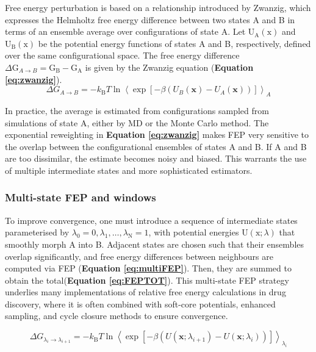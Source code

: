 \documentclass[12pt]{article}
\begin{document}
Free energy perturbation is based on a relationship introduced by Zwanzig\cite{CH10_zwanzig1954high}, which expresses the Helmholtz free energy difference between two states A and B in terms of an ensemble average over configurations of state A. 
Let $\textrm{U}_\textrm{A}(\textrm{x})$ and $\textrm{U}_\textrm{B}(\textrm{x})$ be the potential energy functions of states A and B, respectively, defined over the same configurational space. 
The free energy difference $\Delta \textrm{G}_{A\to B} = \textrm{G}_\textrm{B} - \textrm{G}_\textrm{A}$ is given by the Zwanzig equation (\textbf{Equation \ref{eq:zwanzig}}).
\
\begin{equation}
\Delta G_{A\to B} 
= -k_\mathrm{B}T \ln 
\left\langle 
\exp\left[ -\beta \left( U_B(\mathbf{x}) - U_A(\mathbf{x}) \right) \right]
\right\rangle_A
\label{eq:zwanzig}
\end{equation}

In practice, the average is estimated from configurations sampled from simulations of state A, either by MD or the Monte Carlo method. 
The exponential reweighting in \textbf{Equation \ref{eq:zwanzig}} makes FEP very sensitive to the overlap between the configurational ensembles of states A and B. If A and B are too dissimilar, the estimate becomes noisy and biased. This warrants the use of multiple intermediate states and more sophisticated estimators. 

\subsubsection{Multi-state FEP and windows}

To improve convergence, one must introduce a sequence of intermediate states parameterised by $\lambda_\textrm{0}=\textrm{0},\lambda_\textrm{1},\ldots,\lambda_\textrm{N}=\textrm{1}$, with potential energies $\textrm{U}(\textrm{x};\lambda)$ that smoothly morph A into B. Adjacent states are chosen such that their ensembles overlap significantly, and free energy differences between neighbours are computed via FEP (\textbf{Equation \ref{eq:multiFEP}}). Then, they are summed to obtain the total(\textbf{Equation \ref{eq:FEPTOT}}). This multi-state FEP strategy underlies many implementations of relative free energy calculations in drug discovery, where it is often combined with soft-core potentials, enhanced sampling, and cycle closure methods to ensure convergence\cite{CH10_aldeghi2018accurate,CH10_wang2015accurate}. 

\begin{equation}
\Delta G_{\lambda_i \to \lambda_{i+1}} 
= -k_\mathrm{B}T \ln 
\left\langle 
\exp\left[ -\beta \left( U(\mathbf{x};\lambda_{i+1}) - U(\mathbf{x};\lambda_i) \right) \right]
\right\rangle_{\lambda_i}
\label{eq:multiFEP}
\end{equation}
\end{document}
